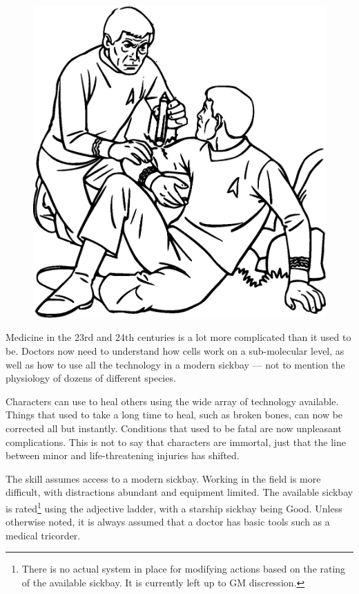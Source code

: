 \documentclass[12pt,titlepage,openany]{book}
\begin{document}
\begin{figure}
    \vspace{-2em}
    \centering
    \includegraphics[width=0.8\linewidth]{img/Medicine.eps}\\
\end{figure}

Medicine in the 23rd and 24th centuries is a lot more complicated than it used
to be. Doctors now need to understand how cells work on a sub-molecular level,
as well as how to use all the technology in a modern sickbay --- not to mention
the physiology of dozens of different species.

Characters can use  to heal others using the wide array of
technology available. Things that used to take a long time to heal, such as
broken bones, can now be corrected all but instantly. Conditions that used to
be fatal are now unpleasant complications. This is not to say that characters
are immortal, just that the line between minor and life-threatening injuries
has shifted.

The  skill assumes access to a modern sickbay. Working in the
field is more difficult, with distractions abundant and equipment limited. The
available sickbay is rated\footnote{There is no actual system in place for
modifying  actions based on the rating of the available
sickbay. It is currently left up to GM discression.} using the adjective
ladder, with a starship sickbay being Good. Unless otherwise noted, it is
always assumed that a doctor has basic tools such as a medical tricorder.
\end{document}
